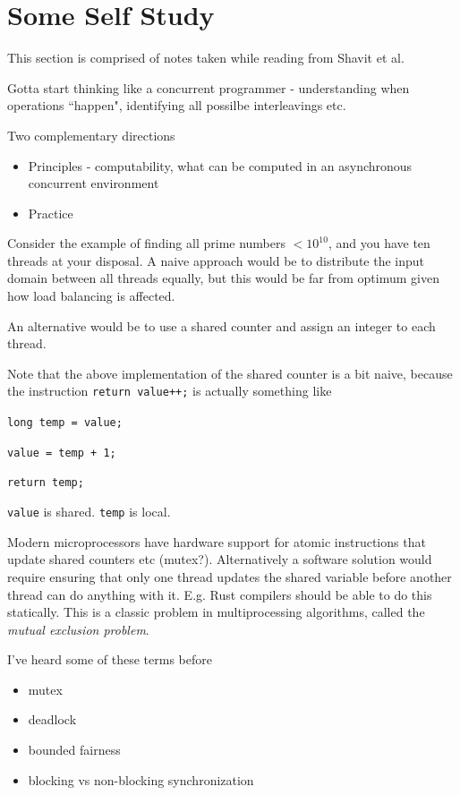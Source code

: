 \documentclass[a4paper]{article}
\begin{document}
\section{Some Self Study}
This section is comprised of notes taken while reading from Shavit et
al.

Gotta start thinking like a concurrent programmer - understanding
when operations ``happen", identifying all possilbe interleavings etc.

Two complementary directions
\begin{itemize}
	\item Principles - computability, what can be computed in an asynchronous concurrent environment
	\item Practice
\end{itemize}

Consider the example of finding all prime numbers $< 10^{10}$,
and you have ten threads at your disposal. A naive approach would be
to distribute the input domain between all threads equally, but this
would be far from optimum given how load balancing is affected.

An alternative would be to use a shared counter and assign an integer
to each thread.

Note that the above implementation of the shared counter is a bit
naive, because the instruction \texttt{return value++;} is actually
something like

\texttt{long temp = value;}

\texttt{value = temp + 1;}

\texttt{return temp;}

\texttt{value} is shared. \texttt{temp} is local. 

Modern microprocessors have hardware support for atomic instructions that
update shared counters etc (mutex?). Alternatively a software solution would require
ensuring that only one thread updates the shared variable before another
thread can do anything with it. E.g. Rust compilers should be able to do this
statically. This is a classic problem in multiprocessing algorithms,
called the \textit{mutual exclusion problem}.

I've heard some of these terms before
\begin{itemize}
	\item mutex
	\item deadlock
	\item bounded fairness
	\item blocking vs non-blocking synchronization
\end{itemize}
\end{document}
